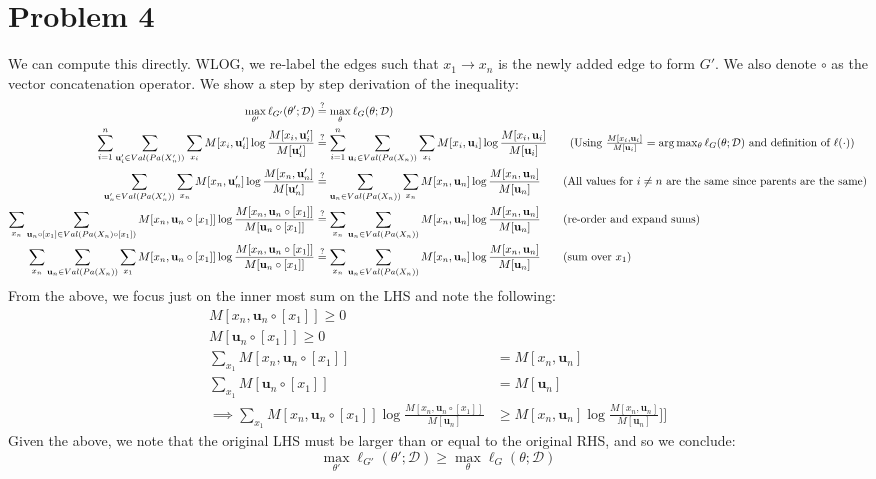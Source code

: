 \documentclass[12pt]{article}
\begin{document}
\section*{Problem 4}

We can compute this directly. WLOG, we re-label the edges such that $x_1 \to x_n$ is the newly added edge to form $G'$. We also denote $\circ$ as the vector concatenation operator. We show a step by step derivation of the inequality:
\begin{align*}
\max_{\theta'} \ell_{G'}(\theta';\mathcal{D}) &\stackrel{?}{=} \max_{\theta} \ell_{G}(\theta;\mathcal{D}) \\
\sum_{i=1}^n \sum_{\textbf{u}_i' \in Val(Pa(X_n'))}\sum_{x_i} M[x_i, \textbf{u}_i'] \log\frac{M[x_i, \textbf{u}_i']}{M[\textbf{u}_i']}  &\stackrel{?}{=} \sum_{i=1}^n \sum_{\textbf{u}_i \in Val(Pa(X_n))}\sum_{x_i} M[x_i, \textbf{u}_i] \log\frac{M[x_i, \textbf{u}_i]}{M[\textbf{u}_i]} \tag{Using $\frac{M[x_i, \textbf{u}_i]}{M[\textbf{u}_i]} = \arg\max_{\theta} \ell_{G}(\theta;\mathcal{D})$ and definition of $\ell(\cdot)$} \\
\sum_{\textbf{u}_n' \in Val(Pa(X_n'))}\sum_{x_n} M[x_n, \textbf{u}_n'] \log\frac{M[x_n, \textbf{u}_n']}{M[\textbf{u}_n']}  &\stackrel{?}{=} \sum_{\textbf{u}_n \in Val(Pa(X_n))}\sum_{x_n} M[x_n, \textbf{u}_n] \log\frac{M[x_n, \textbf{u}_n]}{M[\textbf{u}_n]} \tag{All values for $i \neq n$ are the same since parents are the same} \\
\sum_{x_n}\sum_{\textbf{u}_n \circ [x_1] \in Val(Pa(X_n) \circ [x_1])} M[x_n, \textbf{u}_n \circ [x_1]] \log\frac{M[x_n, \textbf{u}_n \circ [x_1]]}{M[\textbf{u}_n \circ [x_1]]}  &\stackrel{?}{=}\sum_{x_n} \sum_{\textbf{u}_n \in Val(Pa(X_n))} M[x_n, \textbf{u}_n] \log\frac{M[x_n, \textbf{u}_n]}{M[\textbf{u}_n]} \tag{re-order and expand sums} \\
\sum_{x_n}\sum_{\textbf{u}_n \in Val(Pa(X_n))} \sum_{x_1} M[x_n, \textbf{u}_n \circ [x_1]] \log\frac{M[x_n, \textbf{u}_n \circ [x_1]]}{M[\textbf{u}_n \circ [x_1]]}  &\stackrel{?}{=} \sum_{x_n}\sum_{\textbf{u}_n \in Val(Pa(X_n))} M[x_n, \textbf{u}_n] \log\frac{M[x_n, \textbf{u}_n]}{M[\textbf{u}_n]} \tag{sum over $x_1$}
\end{align*}
From the above, we focus just on the inner most sum on the LHS and note the following:
\begin{align*}
M[x_n, \textbf{u}_n \circ [x_1]] \geq 0 \\
M[\textbf{u}_n \circ [x_1]] \geq 0 \\
\sum_{x_1} M[x_n, \textbf{u}_n \circ [x_1]] &= M[x_n, \textbf{u}_n] \\
\sum_{x_1} M[\textbf{u}_n \circ [x_1]] &= M[\textbf{u}_n] \\
\implies \sum_{x_1}M[x_n, \textbf{u}_n \circ [x_1]] \log \frac{M[x_n, \textbf{u}_n \circ [x_1]]}{M[\textbf{u}_n]} &\geq M[x_n, \textbf{u}_n ] \log \frac{M[x_n, \textbf{u}_n ]}{M[\textbf{u}_n]} ]] \tag{by the log sum inequality}
\end{align*}
Given the above, we note that the original LHS must be larger than or equal to the original RHS, and so we conclude:
$$
\max_{\theta'} \ell_{G'}(\theta';\mathcal{D}) \geq \max_{\theta} \ell_{G}(\theta;\mathcal{D})
$$
\end{document}
